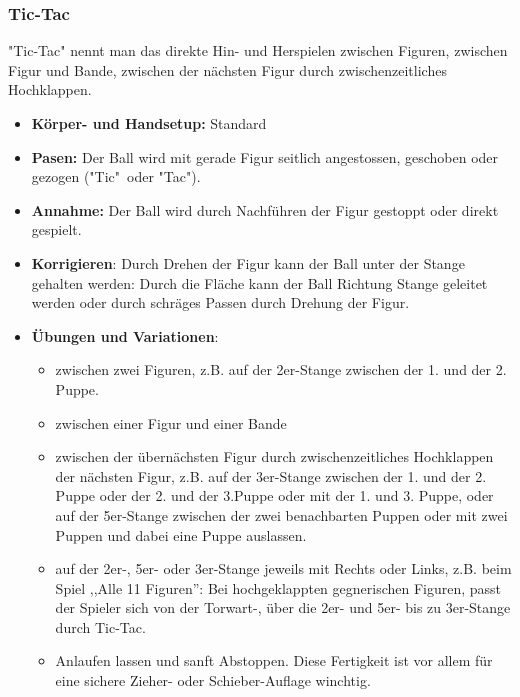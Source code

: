 \subsubsection{Tic-Tac}
\label{technik:offensive:eine:tictac}
"Tic-Tac" nennt man das direkte Hin- und Herspielen zwischen Figuren, zwischen Figur und Bande, zwischen der nächsten Figur durch zwischenzeitliches Hochklappen. 
\begin{itemize}
    \item \textbf{Körper- und Handsetup:} Standard 
    \item \textbf{Pasen:} Der Ball wird mit gerade Figur seitlich angestossen, geschoben oder gezogen ("Tic"\ oder "Tac").
    \item \textbf{Annahme:} Der Ball wird durch Nachführen der Figur gestoppt oder direkt gespielt.
    \item \textbf{Korrigieren}: Durch Drehen der Figur kann der Ball unter der Stange gehalten werden: Durch die Fläche kann der Ball Richtung Stange geleitet werden oder durch schräges Passen durch Drehung der Figur.  
    \item \textbf{Übungen und Variationen}:
        \begin{itemize}
            \item zwischen zwei Figuren, z.B. auf der 2er-Stange zwischen der 1. und der 2. Puppe.
            \item zwischen einer Figur und einer Bande
            \item zwischen der übernächsten Figur durch zwischenzeitliches Hochklappen der nächsten Figur, z.B. auf der 3er-Stange zwischen der 1. und der 2. Puppe oder der 2. und der 3.Puppe oder mit der 1. und 3. Puppe, oder auf der 5er-Stange zwischen der zwei benachbarten Puppen oder mit zwei Puppen und dabei eine Puppe auslassen.
            \item auf der 2er-, 5er- oder 3er-Stange jeweils mit Rechts oder Links, z.B. beim Spiel ,,Alle 11 Figuren'': Bei hochgeklappten gegnerischen Figuren, passt der Spieler sich von der Torwart-, über die 2er- und 5er- bis zu 3er-Stange durch Tic-Tac. 
            \item Anlaufen lassen und sanft Abstoppen. Diese Fertigkeit ist vor allem für eine sichere Zieher- oder Schieber-Auflage winchtig.
        \end{itemize}
\end{itemize}


